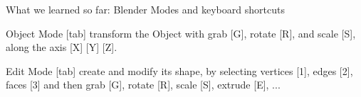 \documentclass[aspectratio=169]{beamer}
\begin{document}
\begin{frame}[fragile]{What we learned so far: \linebreak Blender Modes and keyboard shortcuts}
    \begin{vfilleditems}
        \item Object Mode [tab]
        {\small \linebreak transform the Object
        \linebreak with grab [G], rotate [R], and scale [S],
        \linebreak along the axis [X] [Y] [Z].}
        \item Edit Mode [tab]
        {\small \linebreak create and modify its shape,
        \linebreak by selecting vertices [1], edges [2], faces [3]
        \linebreak and then grab [G], rotate [R], scale [S], extrude [E], ...}
    \end{vfilleditems}
\end{frame}
\end{document}
